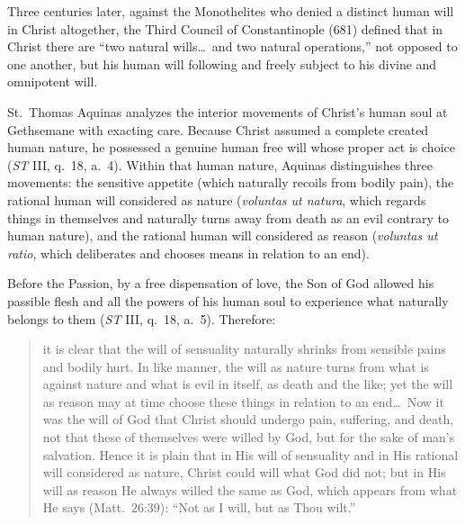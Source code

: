 Three centuries later, against the Monothelites who denied a distinct human will in Christ altogether, the Third Council of Constantinople (681) defined that in Christ there are ``two natural wills\dots\ and two natural operations,'' not opposed to one another, but his human will following and freely subject to his divine and omnipotent will.

St.\ Thomas Aquinas analyzes the interior movements of Christ's human soul at Gethsemane with exacting care. Because Christ assumed a complete created human nature, he possessed a genuine human free will whose proper act is choice (\emph{ST} III, q.\ 18, a.\ 4). Within that human nature, Aquinas distinguishes three movements: the sensitive appetite (which naturally recoils from bodily pain), the rational human will considered as nature (\emph{voluntas ut natura}, which regards things in themselves and naturally turns away from death as an evil contrary to human nature), and the rational human will considered as reason (\emph{voluntas ut ratio}, which deliberates and chooses means in relation to an end).

Before the Passion, by a free dispensation of love, the Son of God allowed his passible flesh and all the powers of his human soul to experience what naturally belongs to them (\emph{ST} III, q.\ 18, a.\ 5). Therefore:

\begin{quote}
it is clear that the will of sensuality naturally shrinks from sensible pains and bodily hurt. In like manner, the will as nature turns from what is against nature and what is evil in itself, as death and the like; yet the will as reason may at time choose these things in relation to an end\dots\ Now it was the will of God that Christ should undergo pain, suffering, and death, not that these of themselves were willed by God, but for the sake of man's salvation. Hence it is plain that in His will of sensuality and in His rational will considered as nature, Christ could will what God did not; but in His will as reason He always willed the same as God, which appears from what He says (Matt.\ 26:39): ``Not as I will, but as Thou wilt.''
\end{quote}

